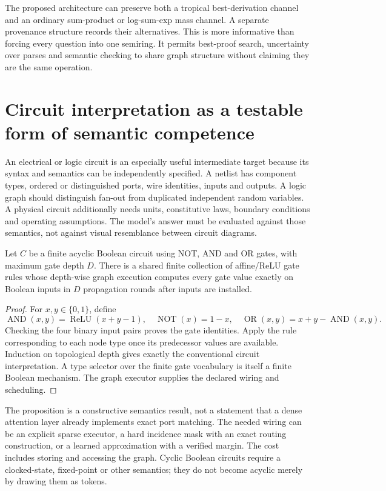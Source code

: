 The proposed architecture can preserve both a tropical best-derivation channel and an ordinary sum-product or log-sum-exp mass channel. A separate provenance structure records their alternatives. This is more informative than forcing every question into one semiring. It permits best-proof search, uncertainty over parses and semantic checking to share graph structure without claiming they are the same operation.

\section{Circuit interpretation as a testable form of semantic competence}
\label{sec:wb-circuit-semantics}

An electrical or logic circuit is an especially useful intermediate target because its syntax and semantics can be independently specified. A netlist has component types, ordered or distinguished ports, wire identities, inputs and outputs. A logic graph should distinguish fan-out from duplicated independent random variables. A physical circuit additionally needs units, constitutive laws, boundary conditions and operating assumptions. The model's answer must be evaluated against those semantics, not against visual resemblance between circuit diagrams.

\begin{proposition}
Let $C$ be a finite acyclic Boolean circuit using NOT, AND and OR gates, with maximum gate depth $D$. There is a shared finite collection of affine/ReLU gate rules whose depth-wise graph execution computes every gate value exactly on Boolean inputs in $D$ propagation rounds after inputs are installed.
\end{proposition}
\begin{proof}
For $x,y\in\{0,1\}$, define
\[
 \operatorname{AND}(x,y)=\operatorname{ReLU}(x+y-1),\quad
 \operatorname{NOT}(x)=1-x,\quad
 \operatorname{OR}(x,y)=x+y-\operatorname{AND}(x,y).
\]
Checking the four binary input pairs proves the gate identities. Apply the rule corresponding to each node type once its predecessor values are available. Induction on topological depth gives exactly the conventional circuit interpretation. A type selector over the finite gate vocabulary is itself a finite Boolean mechanism. The graph executor supplies the declared wiring and scheduling.
\end{proof}

The proposition is a constructive semantics result, not a statement that a dense attention layer already implements exact port matching. The needed wiring can be an explicit sparse executor, a hard incidence mask with an exact routing construction, or a learned approximation with a verified margin. The cost includes storing and accessing the graph. Cyclic Boolean circuits require a clocked-state, fixed-point or other semantics; they do not become acyclic merely by drawing them as tokens.

